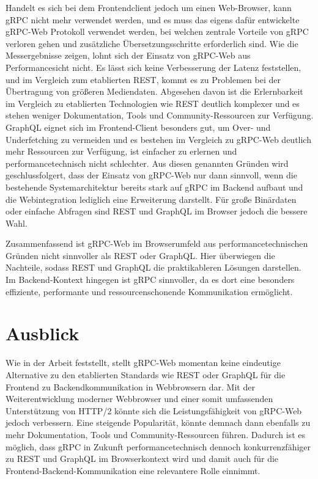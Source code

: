 Handelt es sich bei dem Frontendclient jedoch um einen Web-Browser, kann gRPC nicht mehr verwendet werden, und es muss das eigens dafür entwickelte gRPC-Web Protokoll verwendet werden, bei welchen zentrale Vorteile von gRPC verloren gehen und zusätzliche Übersetzungsschritte erforderlich sind. Wie die Messergebnisse zeigen, lohnt sich der Einsatz von gRPC-Web aus Performancesicht nicht. Es lässt sich keine Verbesserung der Latenz feststellen, und im Vergleich zum etablierten REST, kommt es zu Problemen bei der Übertragung von größeren Mediendaten. Abgesehen davon ist die Erlernbarkeit im Vergleich zu etablierten Technologien wie REST deutlich komplexer und es stehen weniger Dokumentation, Tools und Community-Ressourcen zur Verfügung. GraphQL eignet sich im Frontend-Client besonders gut, um Over- und Underfetching zu vermeiden und es bestehen im Vergleich zu gRPC-Web deutlich mehr Ressourcen zur Verfügung, ist einfacher zu erlernen und performancetechnisch nicht schlechter. 
Aus diesen genannten Gründen wird geschlussfolgert, dass der Einsatz von gRPC-Web nur dann sinnvoll, wenn die bestehende Systemarchitektur bereits stark auf gRPC im Backend aufbaut und die Webintegration lediglich eine Erweiterung darstellt. Für große Binärdaten oder einfache Abfragen sind REST und GraphQL im Browser jedoch die bessere Wahl.


Zusammenfassend ist gRPC-Web im Browserumfeld aus performancetechnischen Gründen nicht sinnvoller als REST oder GraphQL. Hier überwiegen die Nachteile, sodass REST und GraphQL die praktikableren Lösungen darstellen. Im Backend-Kontext hingegen ist gRPC sinnvoller, da es dort eine besonders effiziente, performante und ressourcenschonende Kommunikation ermöglicht.


\section{Ausblick}
Wie in der Arbeit feststellt, stellt gRPC-Web momentan keine eindeutige Alternative zu den etablierten Standards wie REST oder GraphQL für die Frontend zu Backendkommunikation in Webbrowsern dar. Mit der Weiterentwicklung moderner Webbrowser und einer somit umfassenden Unterstützung von HTTP/2 könnte sich die Leistungsfähigkeit von gRPC-Web jedoch verbessern. Eine steigende Popularität, könnte demnach dann ebenfalls zu mehr Dokumentation, Tools und Community-Ressourcen führen. Dadurch ist es möglich, dass gRPC in Zukunft performancetechnisch dennoch konkurrenzfähiger zu REST und GraphQL im Browserkontext wird und damit auch für die Frontend-Backend-Kommunikation eine relevantere Rolle einnimmt.
\chapterend
